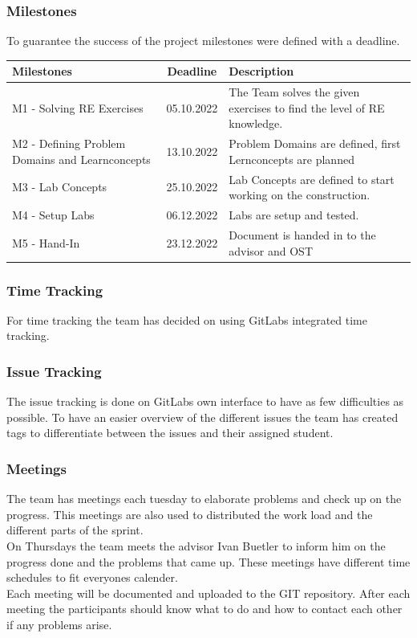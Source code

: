 \subsubsection*{Milestones}
To guarantee the success of the project milestones were defined with a deadline.

\begin{table}[H]
    \centering
    \begin{tabular}[]{|| p{5cm} | c | p{6.2cm} ||}
        \hline
        Milestones & Deadline & Description \\
        \hline \hline
        M1 - Solving RE Exercises & 05.10.2022 & The Team solves the given exercises to find the level of RE knowledge. \\
        \hline
        M2 - Defining Problem Domains and Learnconcepts& 13.10.2022 & Problem Domains are defined, first Lernconcepts are planned \\
        \hline
        M3 - Lab Concepts & 25.10.2022 & Lab Concepts are defined to start working on the construction. \\
        \hline
        M4 - Setup Labs & 06.12.2022 & Labs are setup and tested. \\
        \hline
        M5 - Hand-In & 23.12.2022 & Document is handed in to the advisor and OST \\
        \hline
    \end{tabular}
\end{table}

\subsubsection*{Time Tracking}
For time tracking the team has decided on using GitLabs integrated time tracking. 
\subsubsection*{Issue Tracking}
The issue tracking is done on GitLabs own interface to have as few difficulties as possible. To have an easier overview of the different issues the team has created tags to differentiate between the issues and their assigned student. 

\subsubsection*{Meetings}
The team has meetings each tuesday to elaborate problems and check up on the progress. This meetings are also used to distributed the work load and the different parts of the sprint. \\
On Thursdays the team meets the advisor Ivan Buetler to inform him on the progress done and the problems that came up. These meetings have different time schedules to fit everyones calender. \\
Each meeting will be documented and uploaded to the GIT repository. After each meeting the participants should know what to do and how to contact each other if any problems arise.
